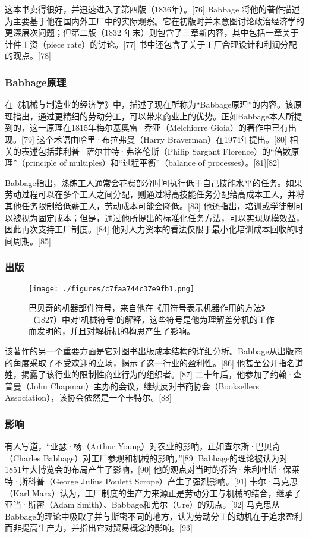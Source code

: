 这本书卖得很好，并迅速进入了第四版（1836年）。[76] Babbage 将他的著作描述为主要基于他在国内外工厂中的实际观察。它在初版时并未意图讨论政治经济学的更深层次问题；但第二版（1832 年末）则包含了三章新内容，其中包括一章关于计件工资（piece rate）的讨论。[77] 书中还包含了关于工厂合理设计和利润分配的观点。[78]
\subsubsection{Babbage原理 } 
在《机械与制造业的经济学》中，描述了现在所称为“Babbage原理”的内容。该原理指出，通过更精细的劳动分工，可以带来商业上的优势。正如Babbage本人所提到的，这一原理在1815年梅尔基奥雷·乔亚（Melchiorre Gioia）的著作中已有出现。[79] 这个术语由哈里·布拉弗曼（Harry Braverman）在1974年提出。[80] 相关的表述包括菲利普·萨尔甘特·弗洛伦斯（Philip Sargant Florence）的“倍数原理”（principle of multiples）和“过程平衡”（balance of processes）。[81][82]

Babbage指出，熟练工人通常会花费部分时间执行低于自己技能水平的任务。如果劳动过程可以在多个工人之间分配，则通过将高技能任务分配给高成本工人，并将其他任务限制给低薪工人，劳动成本可能会降低。[83] 他还指出，培训或学徒制可以被视为固定成本；但是，通过他所提出的标准化任务方法，可以实现规模效益，因此再次支持工厂制度。[84] 他对人力资本的看法仅限于最小化培训成本回收的时间周期。[85]
\subsubsection{出版}  
\begin{figure}[ht]
\centering
\texttt{[image: ./figures/c7faa744c37e9fb1.png]}
\caption{巴贝奇的机器部件符号，来自他在《用符号表示机器作用的方法》（1827）中对‘机械符号’的解释，这些符号是他为理解差分机的工作而发明的，并且对解析机的构思产生了影响。} \label{fig_CRSBQ_4}
\end{figure}
该著作的另一个重要方面是它对图书出版成本结构的详细分析。Babbage从出版商的角度采取了不受欢迎的立场，揭示了这一行业的盈利性。[86] 他甚至公开指名道姓，揭露了该行业的限制性商业行为的组织者。[87] 二十年后，他参加了约翰·查普曼（John Chapman）主办的会议，继续反对书商协会（Booksellers Association），该协会依然是一个卡特尔。[88]
\subsubsection{影响}  
有人写道，“亚瑟·杨（Arthur Young）对农业的影响，正如查尔斯·巴贝奇（Charles Babbage）对工厂参观和机械的影响。”[89] Babbage的理论被认为对1851年大博览会的布局产生了影响，[90] 他的观点对当时的乔治·朱利叶斯·保莱特·斯科普（George Julius Poulett Scrope）产生了强烈影响。[91] 卡尔·马克思（Karl Marx）认为，工厂制度的生产力来源正是劳动分工与机械的结合，继承了亚当·斯密（Adam Smith）、Babbage和尤尔（Ure）的观点。[92] 马克思从Babbage的理论中吸取了并与斯密不同的地方，认为劳动分工的动机在于追求盈利而非提高生产力，并指出它对贸易概念的影响。[93]

